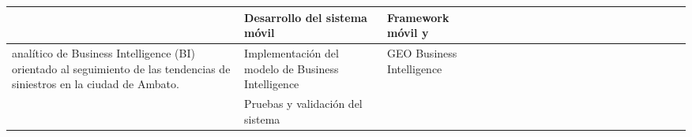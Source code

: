 \begin{landscape}
\begin{ThreePartTable}
\begin{longtable}{|p{}|p{5.5cm}|p{4cm}|l|l|l|l|l|l|l|l|l|l|l|l|l|l|l|l|l|l|l|}
            \cline{2-2}\cline{4-21}
                                                                                & Desarrollo del sistema móvil                                        & Framework móvil y                                                                                                   &                                       &                                       &                                       &                                       &                      &                      &                      &                      & \cellcolor{green!25} & \cellcolor{green!25} & \cellcolor{green!25} &                      &                      &                      &                      \\
            \hline
            \cline{2-2}\cline{4-21}
            \hline
            \multirow{3}{0.41\textwidth}{ analítico de
                Business Intelligence (BI) orientado al seguimiento de las tendencias de siniestros
            en la ciudad de Ambato.}                                            & Implementación del modelo de Business Intelligence                  & \multirow{2}{0.28\textwidth}{GEO Business Intelligence}                                                             &                                       &                                       &                                       &                                       &                      &                      &                      &                      &                      &                      &                      &                      & \cellcolor{green!25} & \cellcolor{green!25} &                      \\
            \cline{2-2}\cline{4-21}
                                                                                & Pruebas y validación del sistema                                    &                                                                                                                     &                                       &                                       &                                       &                                       &                      &                      &                      &                      &                      &                      &                      &                      & \cellcolor{green!25} & \cellcolor{green!25} &                      \\
            \cline{2-2}\cline{4-21}

\end{longtable}
\end{ThreePartTable}
\end{landscape}

